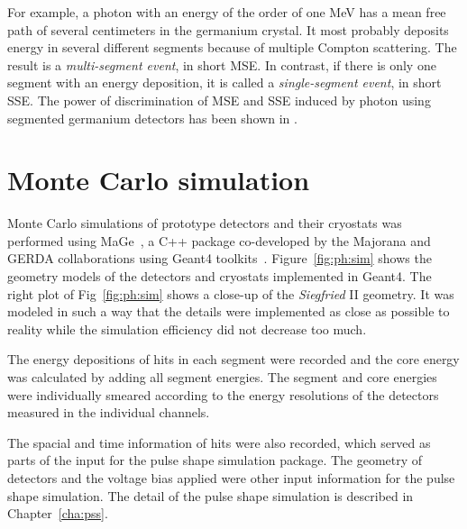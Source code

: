 
For example, a photon with an energy of the order of one MeV has a
mean free path of several centimeters in the germanium crystal. It
most probably deposits energy in several different segments because of
multiple Compton scattering. The result is a \emph{multi-segment
  event}, in short MSE. In contrast, if there is only one segment with
an energy deposition, it is called a \emph{single-segment event}, in
short SSE. The power of discrimination of MSE and SSE induced by
photon using segmented germanium detectors has been shown in
\cite{Pid07}.

\section{Monte Carlo simulation} 
\label{sec:ph:sim}
Monte Carlo simulations of prototype detectors and their cryostats was
performed using MaGe~\cite{Mag08}, a C++ package co-developed by the
Majorana and GERDA collaborations using Geant4
toolkits~\cite{Gea03,Gea06}. Figure~\ref{fig:ph:sim} shows the
geometry models of the detectors and cryostats implemented in Geant4.
The right plot of Fig~\ref{fig:ph:sim} shows a close-up of the
\emph{Siegfried} II geometry. It was modeled in such a way that the
details were implemented as close as possible to reality while the
simulation efficiency did not decrease too much.

The energy depositions of hits in each segment were recorded and the
core energy was calculated by adding all segment energies. The segment
and core energies were individually smeared according to the energy
resolutions of the detectors measured in the individual channels.

The spacial and time information of hits were also recorded, which
served as parts of the input for the pulse shape simulation package.
The geometry of detectors and the voltage bias applied were other
input information for the pulse shape simulation. The detail of the
pulse shape simulation is described in Chapter~\ref{cha:pss}.
 
